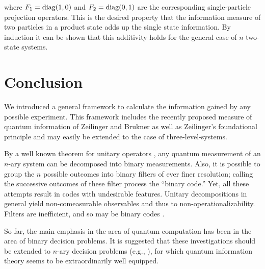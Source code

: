 where $F_1={\rm diag} (1,0)$ and $F_2={\rm diag} (0,1)$
are the corresponding single-particle projection operators.
This is the desired property that the information measure of
two particles in a product state adds up the single state information.
By induction it can be shown that this additivity holds for
the general case of $n$ two-state systems.



\section{Conclusion}
We introduced a general framework to calculate the information gained by any possible experiment.
This framework includes the recently proposed
measure of quantum information of Zeilinger and Brukner as well as Zeilinger's foundational principle and may easily be extended to the case of three-level-systems.

By a well known theorem for unitary operators
\cite{murnaghan},
any quantum measurement of an $n$-ary system can be decomposed
into binary measurements.
Also, it is possible to group the $n$ possible outcomes into binary filters of
ever finer resolution; calling the successive outcomes of these filter process
the ``binary code.''
Yet, all these attempts result in codes with undesirable features.
Unitary decompositions in general yield non-comeasurable observables and thus to
non-operationalizability. Filters are inefficient, and so may be binary codes
\cite{Cal-Cam-96}.

So far, the main emphasis in the area of quantum computation
has been in the area of binary decision problems.
It is suggested that these investigations should be extended to
$n$-ary decision problems (e.g., \cite[pp. 332-340]{kleene-52}),
for which quantum information theory seems
to be extraordinarily well equipped.







